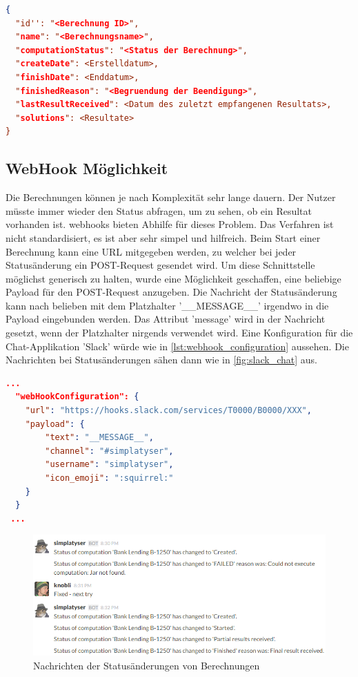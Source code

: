 \begin{lstlisting}[language=JSON, caption=Aufbau einer Antwort auf eine Statusabfrage, label=lst:status_response]  
{
  "id'': "<Berechnung ID>",
  "name": "<Berechnungsname>",
  "computationStatus": "<Status der Berechnung>",
  "createDate": <Erstelldatum>,
  "finishDate": <Enddatum>,
  "finishedReason": "<Begruendung der Beendigung>",
  "lastResultReceived": <Datum des zuletzt empfangenen Resultats>,
  "solutions": <Resultate>
}
\end{lstlisting}

\subsection{WebHook Möglichkeit}
Die Berechnungen können je nach Komplexität sehr lange dauern. Der Nutzer müsste immer wieder den Status abfragen, um zu sehen, ob ein Resultat vorhanden ist. \glspl{webhook} 
bieten Abhilfe für dieses Problem. Das Verfahren ist nicht standardisiert, es ist aber sehr simpel und hilfreich. Beim Start einer Berechnung kann eine URL mitgegeben werden, zu welcher 
bei jeder Statusänderung ein POST-Request gesendet wird. Um diese Schnittstelle möglichst generisch zu halten, wurde eine Möglichkeit geschaffen, eine beliebige Payload für den 
POST-Request anzugeben. Die Nachricht der Statusänderung kann nach belieben mit dem Platzhalter '\_\_MESSAGE\_\_' irgendwo in die Payload eingebunden werden. Das Attribut 'message' 
wird in der Nachricht gesetzt, wenn der Platzhalter nirgends verwendet wird. Eine Konfiguration für die Chat-Applikation 'Slack' würde wie in \autoref{lst:webhook_configuration} 
aussehen. Die Nachrichten bei Statusänderungen sähen dann wie in \autoref{fig:slack_chat} aus.

\begin{lstlisting}[language=JSON, caption=Beispiel einer WebHook Konfiguration für Slack, label=lst:webhook_configuration]
  ...  
  "webHookConfiguration": {
    "url": "https://hooks.slack.com/services/T0000/B0000/XXX",
    "payload": {
        "text": "__MESSAGE__",
        "channel": "#simplatyser",
        "username": "simplatyser",
        "icon_emoji": ":squirrel:"
    }
  }
 ...
\end{lstlisting}

\begin{figure}[h]
\centering
\includegraphics[scale=0.8]{images/slack_chat.png}
\caption[Nachrichten der Statusänderungen von Berechnungen]{Nachrichten der Statusänderungen von Berechnungen \selfmade{}}
\label{fig:slack_chat}
\end{figure}

